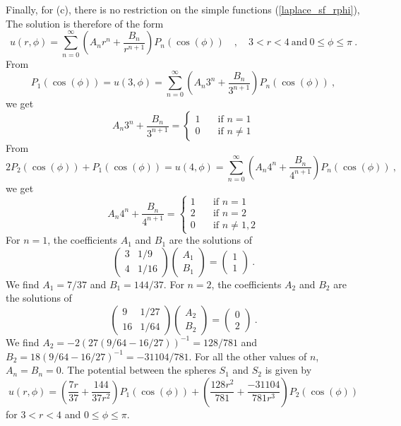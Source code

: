 \begin{egg}
Finally, for (c), there is no restriction on the simple functions
(\ref{laplace_sf_rphi}),  The solution is therefore of the form
\[
u(r,\phi) = \sum_{n=0}^\infty \left(A_n r^n + \frac{B_n}{r^{n+1}} \right)
P_n(\cos(\phi))
\quad , \quad 3 < r < 4 \ \text{and} \ 0 \leq \phi \leq \pi \ .
\]
From 
\[
P_1(\cos(\phi)) = u(3,\phi)
= \sum_{n=0}^\infty \left(A_n 3^n + \frac{B_n}{3^{n+1}} \right)
P_n(\cos(\phi)) \ ,
\]
we get
\[
A_n 3^n + \frac{B_n}{3^{n+1}} = \begin{cases}
1 & \quad \text{if $n=1$}\\
0 &  \quad \text{if $n\neq 1$}
\end{cases}
\]
From
\[
2 P_2(\cos(\phi)) + P_1(\cos(\phi)) = u(4,\phi)
= \sum_{n=0}^\infty \left(A_n 4^n + \frac{B_n}{4^{n+1}} \right)
P_n(\cos(\phi)) \ ,
\]
we get
\[
A_n 4^n + \frac{B_n}{4^{n+1}} = \begin{cases}
1 & \quad \text{if $n=1$}\\
2 & \quad \text{if $n=2$} \\
0 &  \quad \text{if $n\neq 1,2$}
\end{cases}
\]
For $n=1$, the coefficients $A_1$ and $B_1$ are the solutions of
\[
\begin{pmatrix}
3 & 1/9 \\ 4 & 1/16
\end{pmatrix}
\begin{pmatrix}
A_1 \\ B_1
\end{pmatrix}
=
\begin{pmatrix}
1 \\ 1
\end{pmatrix}
\ .
\]
We find $A_1 = 7/37$ and $B_1 = 144/37$.  For $n=2$, the coefficients
$A_2$ and $B_2$ are the solutions of 
\[
\begin{pmatrix}
9 & 1/27 \\ 16 & 1/64
\end{pmatrix}
\begin{pmatrix}
A_2 \\ B_2
\end{pmatrix}
=
\begin{pmatrix}
0 \\ 2
\end{pmatrix}
\ .
\]
We find $A_2 = -2 (27(9/64-16/27))^{-1}= 128/781$ and\\
$B_2 = 18 (9/64 - 16/27)^{-1}=-31104/781$.   For all the other values of $n$,
$A_n = B_n = 0$.  The potential between the spheres $S_1$ and $S_2$ is
given by
\[
u(r,\phi) = \left(\frac{7r}{37} + \frac{144}{37r^2} \right)
P_1(\cos(\phi)) +
\left( \frac{128 r^2}{781} + \frac{ -31104}{781 r^3} \right)
P_2(\cos(\phi))
\]
for $3 < r < 4$ and $0 \leq \phi \leq \pi$.
\end{egg}

